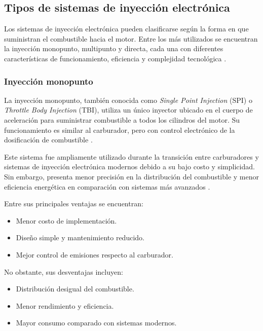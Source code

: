 \subsection{Tipos de sistemas de inyección electrónica}%

Los sistemas de inyección electrónica pueden clasificarse según la forma en que suministran el combustible hacia el motor. Entre los más utilizados se encuentran la inyección monopunto, multipunto y directa, cada una con diferentes características de funcionamiento, eficiencia y complejidad tecnológica \citep{Bosch_Automotive, web_inyeccion1}.

\subsubsection{Inyección monopunto}

La inyección monopunto, también conocida como \textit{Single Point Injection} (SPI) o \textit{Throttle Body Injection} (TBI), utiliza un único inyector ubicado en el cuerpo de aceleración para suministrar combustible a todos los cilindros del motor. Su funcionamiento es similar al carburador, pero con control electrónico de la dosificación de combustible \citep{Bosch_Automotive}.

Este sistema fue ampliamente utilizado durante la transición entre carburadores y sistemas de inyección electrónica modernos debido a su bajo costo y simplicidad. Sin embargo, presenta menor precisión en la distribución del combustible y menor eficiencia energética en comparación con sistemas más avanzados \citep{web_inyeccion2}.

Entre sus principales ventajas se encuentran:
\begin{itemize}
    \item Menor costo de implementación.
    \item Diseño simple y mantenimiento reducido.
    \item Mejor control de emisiones respecto al carburador.
\end{itemize}

No obstante, sus desventajas incluyen:
\begin{itemize}
    \item Distribución desigual del combustible.
    \item Menor rendimiento y eficiencia.
    \item Mayor consumo comparado con sistemas modernos.
\end{itemize}

